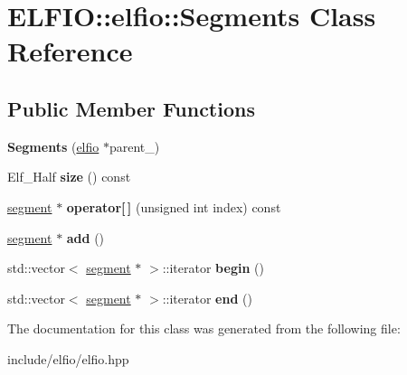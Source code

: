 \hypertarget{class_e_l_f_i_o_1_1elfio_1_1_segments}{}\section{E\+L\+F\+IO\+:\+:elfio\+:\+:Segments Class Reference}
\label{class_e_l_f_i_o_1_1elfio_1_1_segments}
\subsection*{Public Member Functions}
\begin{DoxyCompactItemize}
\item 
{\bfseries Segments} (\hyperlink{class_e_l_f_i_o_1_1elfio}{elfio} $\ast$parent\+\_\+)\hypertarget{class_e_l_f_i_o_1_1elfio_1_1_segments_a299f1eec6a17d189fbc2fb21c3208097}{}\label{class_e_l_f_i_o_1_1elfio_1_1_segments_a299f1eec6a17d189fbc2fb21c3208097}

\item 
Elf\+\_\+\+Half {\bfseries size} () const \hypertarget{class_e_l_f_i_o_1_1elfio_1_1_segments_a18257fed02ff029ccca28e70b7eabfa6}{}\label{class_e_l_f_i_o_1_1elfio_1_1_segments_a18257fed02ff029ccca28e70b7eabfa6}

\item 
\hyperlink{class_e_l_f_i_o_1_1segment}{segment} $\ast$ {\bfseries operator\mbox{[}$\,$\mbox{]}} (unsigned int index) const \hypertarget{class_e_l_f_i_o_1_1elfio_1_1_segments_a6365d4a063e12c2ecd5dc7d806c1d8cd}{}\label{class_e_l_f_i_o_1_1elfio_1_1_segments_a6365d4a063e12c2ecd5dc7d806c1d8cd}

\item 
\hyperlink{class_e_l_f_i_o_1_1segment}{segment} $\ast$ {\bfseries add} ()\hypertarget{class_e_l_f_i_o_1_1elfio_1_1_segments_aec4a8a50a611bf205091aefb28e042e4}{}\label{class_e_l_f_i_o_1_1elfio_1_1_segments_aec4a8a50a611bf205091aefb28e042e4}

\item 
std\+::vector$<$ \hyperlink{class_e_l_f_i_o_1_1segment}{segment} $\ast$ $>$\+::iterator {\bfseries begin} ()\hypertarget{class_e_l_f_i_o_1_1elfio_1_1_segments_a193dc7c894c720b0f3af9c1fd5e9ebed}{}\label{class_e_l_f_i_o_1_1elfio_1_1_segments_a193dc7c894c720b0f3af9c1fd5e9ebed}

\item 
std\+::vector$<$ \hyperlink{class_e_l_f_i_o_1_1segment}{segment} $\ast$ $>$\+::iterator {\bfseries end} ()\hypertarget{class_e_l_f_i_o_1_1elfio_1_1_segments_a76937c3ec1bf18ca5b59e1f59f835e66}{}\label{class_e_l_f_i_o_1_1elfio_1_1_segments_a76937c3ec1bf18ca5b59e1f59f835e66}

\end{DoxyCompactItemize}


The documentation for this class was generated from the following file\+:\begin{DoxyCompactItemize}
\item 
include/elfio/elfio.\+hpp\end{DoxyCompactItemize}
